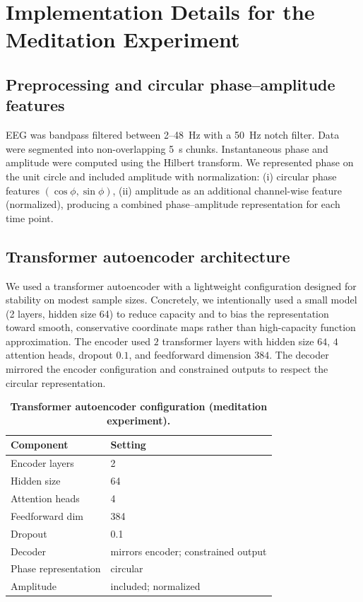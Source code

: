 \documentclass[5p,twocolumn,authoryear]{elsarticle}
\begin{document}
\section{Implementation Details for the Meditation Experiment}
\label{app:meditation_impl}

\subsection{Preprocessing and circular phase--amplitude features}
EEG was bandpass filtered between 2--48~Hz with a 50~Hz notch filter. Data were segmented into non-overlapping 5~s chunks. Instantaneous phase and amplitude were computed using the Hilbert transform. We represented phase on the unit circle and included amplitude with normalization:
(i) circular phase features $(\cos\phi, \sin\phi)$,
(ii) amplitude as an additional channel-wise feature (normalized), producing a combined phase--amplitude representation for each time point.

\subsection{Transformer autoencoder architecture}
\label{app:ae_arch}
We used a transformer autoencoder with a lightweight configuration designed for stability on modest sample sizes. Concretely, we intentionally used a small model (2 layers, hidden size 64) to reduce capacity and to bias the representation toward smooth, conservative coordinate maps rather than high-capacity function approximation. The encoder used $2$ transformer layers with hidden size $64$, $4$ attention heads, dropout $0.1$, and feedforward dimension $384$. The decoder mirrored the encoder configuration and constrained outputs to respect the circular representation.

\begin{table}[htbp]
\centering
\caption{\textbf{Transformer autoencoder configuration (meditation experiment).}}
\label{tab:med_ae_config}
\begin{tabular}{ll}
\toprule
Component & Setting \\
\midrule
Encoder layers & 2 \\
Hidden size & 64 \\
Attention heads & 4 \\
Feedforward dim & 384 \\
Dropout & 0.1 \\
Decoder & mirrors encoder; constrained output \\
Phase representation & circular \\
Amplitude & included; normalized \\
\bottomrule
\end{tabular}
\end{table}
\end{document}
